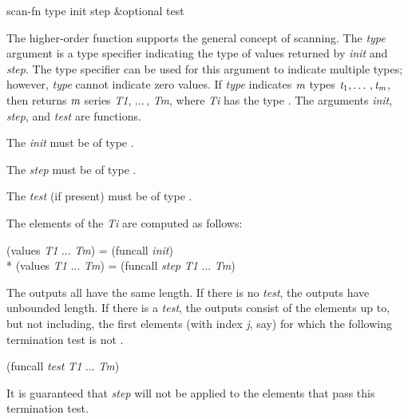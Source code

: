 \begin{defun}[Function]
scan-fn type init step &optional test

The higher-order function  supports the general concept of
scanning.  The \emph{type} argument is a type specifier indicating
the type of values returned by \emph{init} and \emph{step}.  The 
type specifier can be used for this argument
to indicate multiple types; however, \emph{type} cannot
indicate zero values.  If \emph{type} indicates $\emph{m}$ types
$\emph{t}_1, \ldots\,, \emph{t}_{\hbox{\scriptsize\it m}}$,
then  returns $\emph{m}$ series
\emph{T1}, $\ldots\,$, \emph{Tm}, where \emph{Ti} has
the type .
The arguments \emph{init}, \emph{step}, and \emph{test} are functions.

The \emph{init} must be of type 
.

The \emph{step} must be of type 
.

The \emph{test} (if present) must be of type 
.

The elements of the \emph{Ti} are computed as follows:
\begin{lisp}
(values \emph{T1} ... \emph{Tm}) = (funcall \emph{init}) \\*
(values \emph{T1} ... \emph{Tm}) = (funcall \emph{step} \emph{T1} ... \emph{Tm})
\end{lisp}

The outputs all have the same length.  If there is no \emph{test}, the
outputs have unbounded length.  If there is a \emph{test}, the outputs
consist of the elements up to, but not including, the first elements (with
index \emph{j}, say) for which the following termination test is not .
\begin{lisp}
(funcall \emph{test} \emph{T1} ... \emph{Tm})
\end{lisp}
It is guaranteed that \emph{step} will
not be applied to the elements that pass this termination test.


\end{defun}
